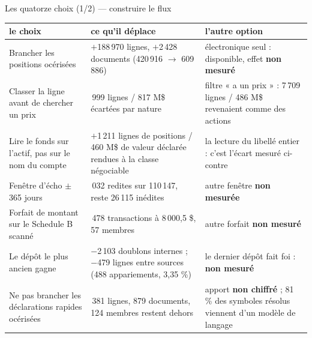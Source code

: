\documentclass[11pt,aspectratio=169]{beamer}
\newcommand{\defl}[1]{{\scriptsize\color{black!55}#1}}
\begin{document}
\begin{frame}{Les quatorze choix (1/2) --- construire le flux}
  \vspace{0pt}
  {\scriptsize
  \begin{tabular}{@{}>{\raggedright\arraybackslash}p{}>{\raggedright\arraybackslash}p{}>{\raggedright\arraybackslash}p{}@{}}
    \toprule
    \textbf{le choix} & \textbf{ce qu'il déplace} & \textbf{l'autre option}\\
    \midrule
    Brancher les positions océrisées
      & $+$188\,970 lignes, $+$2\,428 documents \defl{(420\,916 $\rightarrow$ 609\,886)}
      & électronique seul : disponible, effet \textbf{non mesuré}\\
    \addlinespace[0.6mm]
    Classer la ligne avant de chercher un prix
      & 9\,999 lignes / 817 M\$ écartées par nature
      & filtre « a un prix » : 7\,709 lignes / 486 M\$ revenaient comme des actions\\
    \addlinespace[0.6mm]
    Lire le fonds sur l'actif, pas sur le nom du compte
      & $+$1\,211 lignes de positions / 460 M\$ de valeur déclarée rendues à la classe négociable
      & la lecture du libellé entier : c'est l'écart mesuré ci-contre\\
    \addlinespace[0.6mm]
    Fenêtre d'écho $\pm$365 jours
      & 84\,032 redites sur 110\,147, reste 26\,115 inédites
      & autre fenêtre \textbf{non mesurée}\\
    \addlinespace[0.6mm]
    Forfait de montant sur le Schedule B scanné
      & 7\,478 transactions à 8\,000,5 \$, 57 membres
      & autre forfait \textbf{non mesuré}\\
    \addlinespace[0.6mm]
    Le dépôt le plus ancien gagne
      & $-$2\,103 doublons internes ; $-$479 lignes entre sources \defl{(488 appariements, 3,35 \%)}
      & le dernier dépôt fait foi : \textbf{non mesuré}\\
    \addlinespace[0.6mm]
    Ne pas brancher les déclarations rapides océrisées
      & 15\,381 lignes, 879 documents, 124 membres restent dehors
      & apport \textbf{non chiffré} ; 81 \% des symboles résolus viennent d'un modèle de langage\\
    \bottomrule
  \end{tabular}}
\end{frame}
\end{document}
